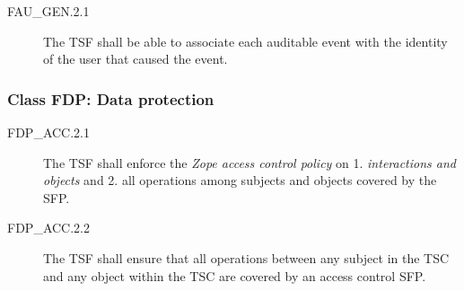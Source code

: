 \documentclass[12pt,english]{scrbook}
\begin{document}



\begin{description}
\item[FAU{\_}GEN.2.1]

The TSF shall be able to associate each auditable event with the identity
of the user that caused the event.


\end{description}





\subsubsection{Class FDP: Data protection}





\begin{description}

  \item[FDP{\_}ACC.2.1 ] The TSF shall enforce the \emph{Zope access control
    policy} on 1. \emph{interactions and objects} and 2. all operations among
    subjects and objects covered by the SFP.

  \item[FDP{\_}ACC.2.2] The TSF shall ensure that all operations between any
    subject in the TSC and any object within the TSC are covered by an access
    control SFP.

\end{description}


\end{document}
